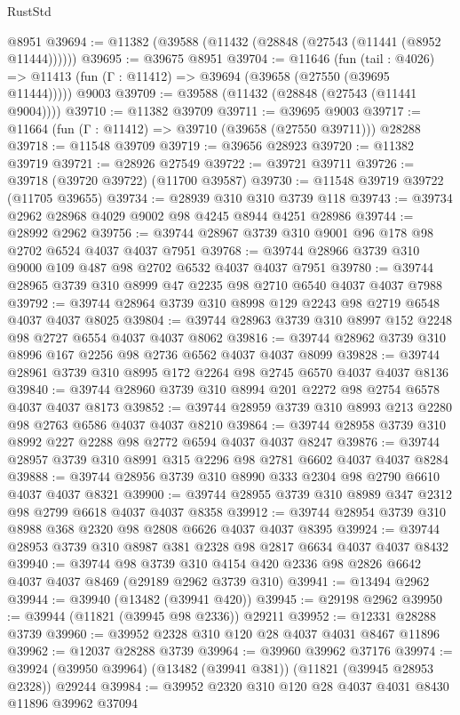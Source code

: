 \begin{lexlean}{RustStd}
\begin{coremodule}
    @8951
@39694 := @11382 (@39588 (@11432 (@28848 (@27543 (@11441 (@8952 @11444))))))
@39695 := @39675 @8951
@39704 := @11646
    (fun (tail : @4026) => @11413 (fun (Γ : @11412) => @39694 (@39658 (@27550 (@39695 @11444)))))
    @9003
@39709 := @39588 (@11432 (@28848 (@27543 (@11441 @9004))))
@39710 := @11382 @39709
@39711 := @39695 @9003
@39717 := @11664 (fun (Γ : @11412) => @39710 (@39658 (@27550 @39711))) @28288
@39718 := @11548 @39709
@39719 := @39656 @28923
@39720 := @11382 @39719
@39721 := @28926 @27549
@39722 := @39721 @39711
@39726 := @39718 (@39720 @39722) (@11700 @39587)
@39730 := @11548 @39719 @39722 (@11705 @39655)
@39734 := @28939 @310 @310 @3739 @118
@39743 := @39734 @2962 @28968 @4029 @9002 @98 @4245 @8944 @4251 @28986
@39744 := @28992 @2962
@39756 := @39744 @28967 @3739 @310 @9001 @96 @178 @98 @2702 @6524 @4037 @4037 @7951
@39768 := @39744 @28966 @3739 @310 @9000 @109 @487 @98 @2702 @6532 @4037 @4037 @7951
@39780 := @39744 @28965 @3739 @310 @8999 @47 @2235 @98 @2710 @6540 @4037 @4037 @7988
@39792 := @39744 @28964 @3739 @310 @8998 @129 @2243 @98 @2719 @6548 @4037 @4037 @8025
@39804 := @39744 @28963 @3739 @310 @8997 @152 @2248 @98 @2727 @6554 @4037 @4037 @8062
@39816 := @39744 @28962 @3739 @310 @8996 @167 @2256 @98 @2736 @6562 @4037 @4037 @8099
@39828 := @39744 @28961 @3739 @310 @8995 @172 @2264 @98 @2745 @6570 @4037 @4037 @8136
@39840 := @39744 @28960 @3739 @310 @8994 @201 @2272 @98 @2754 @6578 @4037 @4037 @8173
@39852 := @39744 @28959 @3739 @310 @8993 @213 @2280 @98 @2763 @6586 @4037 @4037 @8210
@39864 := @39744 @28958 @3739 @310 @8992 @227 @2288 @98 @2772 @6594 @4037 @4037 @8247
@39876 := @39744 @28957 @3739 @310 @8991 @315 @2296 @98 @2781 @6602 @4037 @4037 @8284
@39888 := @39744 @28956 @3739 @310 @8990 @333 @2304 @98 @2790 @6610 @4037 @4037 @8321
@39900 := @39744 @28955 @3739 @310 @8989 @347 @2312 @98 @2799 @6618 @4037 @4037 @8358
@39912 := @39744 @28954 @3739 @310 @8988 @368 @2320 @98 @2808 @6626 @4037 @4037 @8395
@39924 := @39744 @28953 @3739 @310 @8987 @381 @2328 @98 @2817 @6634 @4037 @4037 @8432
@39940 := @39744
    @98
    @3739
    @310
    @4154
    @420
    @2336
    @98
    @2826
    @6642
    @4037
    @4037
    @8469
    (@29189 @2962 @3739 @310)
@39941 := @13494 @2962
@39944 := @39940 (@13482 (@39941 @420))
@39945 := @29198 @2962
@39950 := @39944 (@11821 (@39945 @98 @2336)) @29211
@39952 := @12331 @28288 @3739
@39960 := @39952 @2328 @310 @120 @28 @4037 @4031 @8467 @11896
@39962 := @12037 @28288 @3739
@39964 := @39960 @39962 @37176
@39974 := @39924 (@39950 @39964) (@13482 (@39941 @381)) (@11821 (@39945 @28953 @2328)) @29244
@39984 := @39952 @2320 @310 @120 @28 @4037 @4031 @8430 @11896 @39962 @37094

\end{coremodule}
\end{lexlean}
